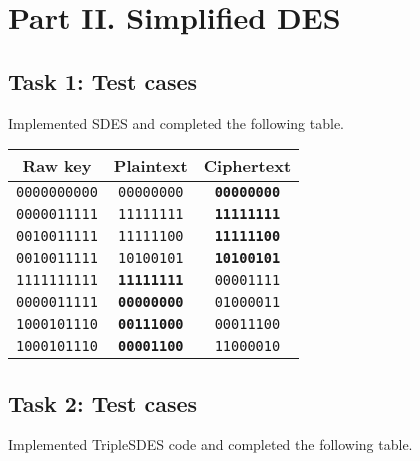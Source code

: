 \documentclass[a4paper,english,12pt]{article}
\begin{document}
\section{Part II. Simplified DES}

\subsection{Task 1: Test cases}

Implemented SDES and completed the following table.

\begin{table}[H]
  \centering
  \begin{tabular}{ccc}
    \hline \textbf{Raw key} &
           \textbf{Plaintext} &
           \textbf{Ciphertext} \\
    \hline
    \texttt{0000000000} & \texttt{00000000} & \texttt{\textbf{00000000}} \\
    \texttt{0000011111} & \texttt{11111111} & \texttt{\textbf{11111111}} \\
    \texttt{0010011111} & \texttt{11111100} & \texttt{\textbf{11111100}} \\
    \texttt{0010011111} & \texttt{10100101} & \texttt{\textbf{10100101}} \\
    \texttt{1111111111} & \texttt{\textbf{11111111}} & \texttt{00001111} \\
    \texttt{0000011111} & \texttt{\textbf{00000000}} & \texttt{01000011} \\
    \texttt{1000101110} & \texttt{\textbf{00111000}} & \texttt{00011100} \\
    \texttt{1000101110} & \texttt{\textbf{00001100}} & \texttt{11000010} \\
    \hline
  \end{tabular}
  \label{table:task1}
\end{table}

\subsection{Task 2: Test cases}

Implemented TripleSDES code and completed the following table.
\end{document}
